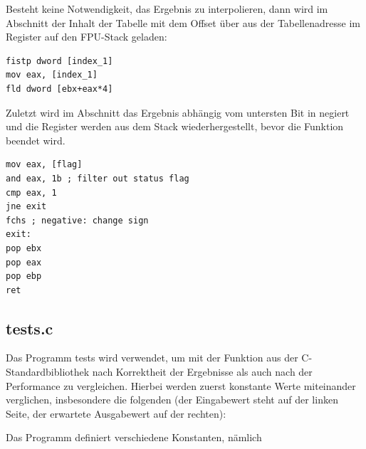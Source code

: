 \documentclass{article}
\begin{document}
	Besteht keine Notwendigkeit, das Ergebnis zu interpolieren,
	dann wird im Abschnitt  der Inhalt der Tabelle
	mit dem Offset  über  aus der
	Tabellenadresse im Register  auf den FPU-Stack
	geladen:

\vspace{0.5cm}

\begin{lstlisting}
fistp dword [index_1]
mov eax, [index_1]
fld dword [ebx+eax*4]
\end{lstlisting}

\vspace{0.5cm}

	Zuletzt wird im Abschnitt  das Ergebnis abhängig
	vom untersten Bit in  negiert und die Register
	werden aus dem Stack wiederhergestellt, bevor die Funktion
	beendet wird.

\vspace{0.5cm}

\begin{lstlisting}
mov eax, [flag]
and eax, 1b ; filter out status flag
cmp eax, 1
jne exit
fchs ; negative: change sign
exit:
pop ebx
pop eax
pop ebp
ret
\end{lstlisting}

\subsection{tests.c}

	Das Programm tests wird verwendet, um 
	mit der Funktion aus der C-Standardbibliothek nach Korrektheit der Ergebnisse als auch nach der
	Performance zu vergleichen. Hierbei werden zuerst konstante Werte miteinander
	verglichen, insbesondere die folgenden (der Eingabewert steht
	auf der linken Seite, der erwartete Ausgabewert auf der rechten):

\vspace{0.5cm}



\vspace{0.5cm}

	Das Programm definiert verschiedene Konstanten, nämlich

\vspace{0.5cm}


\end{document}
